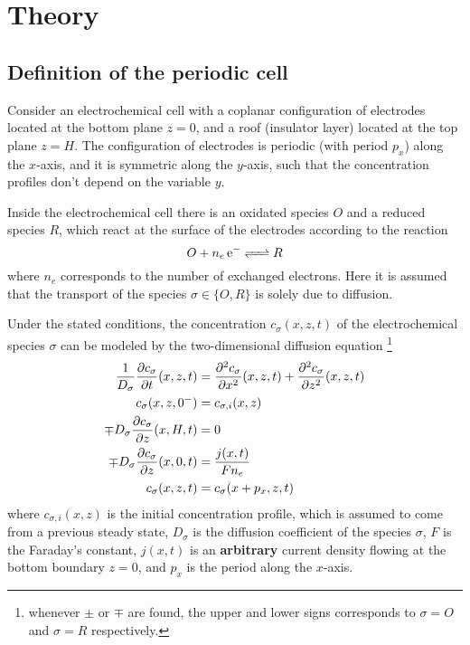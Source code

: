 

\section{Theory}
\label{theory}

\subsection{Definition of the periodic cell}
\label{coplanar:def:problema}

Consider an electrochemical cell with a coplanar configuration of electrodes
located at the bottom plane $z=0$,
and a roof (insulator layer) located at the top plane $z=H$.
The configuration of electrodes is periodic (with period $p_{x}$) along the $x$-axis,
and it is symmetric along the $y$-axis,
such that the concentration profiles don't depend on the variable $y$.

Inside the electrochemical cell there is an oxidated species $O$ and a reduced species $R$,
which react at the surface of the electrodes according to the reaction
\begin{equation}
	\label{coplanar:eqn:reaccion}
	O + n_{e}\, \mathrm{e}^{-} \flechadoble R
\end{equation}
where $n_{e}$ corresponds to the number of exchanged electrons.
Here it is assumed that the transport of the species $\sigma \in \{O,R\}$ is solely due to diffusion.

Under the stated conditions,
the concentration $c_{\sigma}(x,z,t)$ of the electrochemical species $\sigma$
can be modeled by the two-di\-men\-sio\-nal diffusion equation%
\footnote{
	whenever $\pm$ or $\mp$ are found,
	the upper and lower signs corresponds to 
	$\sigma=O$ and $\sigma=R$ respectively.
}
\begin{subequations}
	\label{coplanar:eqn:difusion:idae}
	\begin{align}
		\frac{1}{D_{\sigma}} \frac{\partial c_{\sigma}}{\partial t}(x,z,t)
		&= \frac{\partial ^2 c_{\sigma}}{\partial x^2}(x,z,t)
		+ \frac{\partial ^2 c_{\sigma}}{\partial z^2}(x,z,t)
		\\
		c_{\sigma}(x,z,0^{-}) &= c_{\sigma,i}(x,z)
		\\
		\mp D_{\sigma} \frac{\partial c_{\sigma}}{\partial z}(x,H,t) &= 0
		\\
		\mp D_{\sigma} \frac{\partial c_{\sigma}}{\partial z}(x,0,t) &= \frac{j(x,t)}{F n_{e}}
		\\
		c_{\sigma}(x, z, t) &= c_{\sigma}(x + p_{x}, z, t)
	\end{align}
\end{subequations}
where $c_{\sigma,i}(x,z)$ is the initial concentration profile,
which is assumed to come from a previous steady state,
$D_{\sigma}$ is the diffusion coefficient of the species $\sigma$,
$F$ is the Faraday's constant,
$j(x,t)$ is an \textbf{arbitrary} current density flowing at the bottom boundary $z=0$,
and $p_{x}$ is the period along the $x$-axis.


